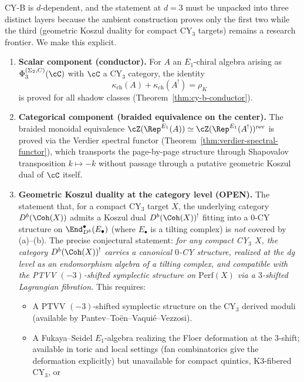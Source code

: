 \begin{remark}[CY-B at \texorpdfstring{$d=3$}{d=3}: precise scope of what is proved and what remains open]
\label{rem:cy-b-d3-precise}
CY-B is $d$-dependent, and the statement at $d=3$ must be
unpacked into three distinct layers because the ambient construction proves
only the first two while the third (geometric Koszul duality for compact
CY$_3$ targets) remains a research frontier. We make this explicit.
\begin{enumerate}[label=\textup{(\alph*)}]
 \item \textbf{Scalar component (conductor).} For $A$ an $E_1$-chiral
 algebra arising as $\Phi_3^{(\Sigma_2, C)}(\cC)$ with $\cC$ a CY$_3$ category, the
 identity
 \[
 \kappa_{\mathrm{ch}}(A) + \kappa_{\mathrm{ch}}(A^!) = \rho_K
 \]
 is proved for all shadow classes (Theorem~\ref{thm:cy-b-conductor}).
 \item \textbf{Categorical component (braided equivalence on the
 center).} The braided monoidal equivalence
 $\cZ(\Rep^{E_1}(A)) \simeq \cZ(\Rep^{E_1}(A^!))^{\mathrm{rev}}$
 is proved via the Verdier spectral functor
 (Theorem~\ref{thm:verdier-spectral-functor}), which transports the
 page-by-page structure through Shapovalov transposition
 $k \mapsto -k$ without passage through a putative geometric Koszul
 dual of $\cC$ itself.
 \item \textbf{Geometric Koszul duality at the category level
 (OPEN).} The statement that, for a compact CY$_3$ target $X$, the
 underlying category $D^b(\Coh(X))$ admits a Koszul dual
 $D^b(\Coh(X))^!$ fitting into a $0$-CY structure on
 $\End^\bullet_{D^b}(E_\bullet)$ (where $E_\bullet$ is a tilting
 complex) is \emph{not} covered by (a)--(b). The precise conjectural
 statement:
 \emph{for any compact CY$_3$ $X$, the category
 $D^b(\Coh(X))^!$ carries a canonical $0$-CY structure, realized at
 the dg level as an endomorphism algebra of a tilting complex, and
 compatible with the PTVV $(-3)$-shifted symplectic structure on
 $\mathrm{Perf}(X)$ via a $3$-shifted Lagrangian fibration.}
 This requires:
 \begin{itemize}
 \item[(i)] A PTVV $(-3)$-shifted symplectic structure on the
 CY$_3$ derived moduli (available by
 Pantev--To\"en--Vaqui\'e--Vezzosi).
 \item[(ii)] A Fukaya--Seidel $E_1$-algebra realizing the Floer
 deformation at the $3$-shift; available in toric and local
 settings (fan combinatorics give the deformation explicitly)
 but unavailable for compact quintics, K3-fibered CY$_3$, or

\end{itemize}
\end{enumerate}
\end{remark}
